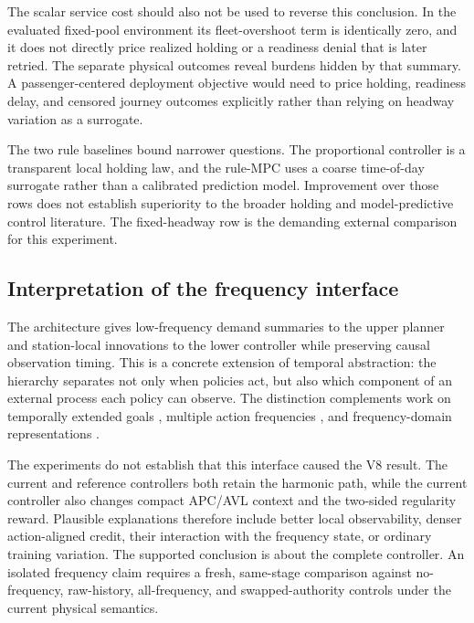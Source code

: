 \documentclass[preprint,12pt,authoryear,nopreprintline]{elsarticle}
\begin{document}
The scalar service cost should also not be used to reverse this
conclusion. In the evaluated fixed-pool environment its fleet-overshoot
term is identically zero, and it does not directly price realized
holding or a readiness denial that is later retried. The separate
physical outcomes reveal burdens hidden by that summary. A
passenger-centered deployment objective would need to price holding,
readiness delay, and censored journey outcomes explicitly rather than
relying on headway variation as a surrogate.

The two rule baselines bound narrower questions. The proportional
controller is a transparent local holding law, and the rule-MPC uses a
coarse time-of-day surrogate rather than a calibrated prediction model.
Improvement over those rows does not establish superiority to the
broader holding and model-predictive control literature. The
fixed-headway row is the demanding external comparison for this
experiment.

\subsection{Interpretation of the frequency
interface}\label{interpretation-of-the-frequency-interface}

The architecture gives low-frequency demand summaries to the upper
planner and station-local innovations to the lower controller while
preserving causal observation timing. This is a concrete extension of
temporal abstraction: the hierarchy separates not only when policies
act, but also which component of an external process each policy can
observe. The distinction complements work on temporally extended goals
\citep{sutton1999between, nachum2018data}, multiple action frequencies
\citep{lee2020multiple, metelli2020persistence, holt2025evocontrol}, and
frequency-domain representations
\citep{huang2025wavelet, duan2025adaptive}.

The experiments do not establish that this interface caused the V8
result. The current and reference controllers both retain the harmonic
path, while the current controller also changes compact APC/AVL context
and the two-sided regularity reward. Plausible explanations therefore
include better local observability, denser action-aligned credit, their
interaction with the frequency state, or ordinary training variation.
The supported conclusion is about the complete controller. An isolated
frequency claim requires a fresh, same-stage comparison against
no-frequency, raw-history, all-frequency, and swapped-authority controls
under the current physical semantics.
\end{document}
